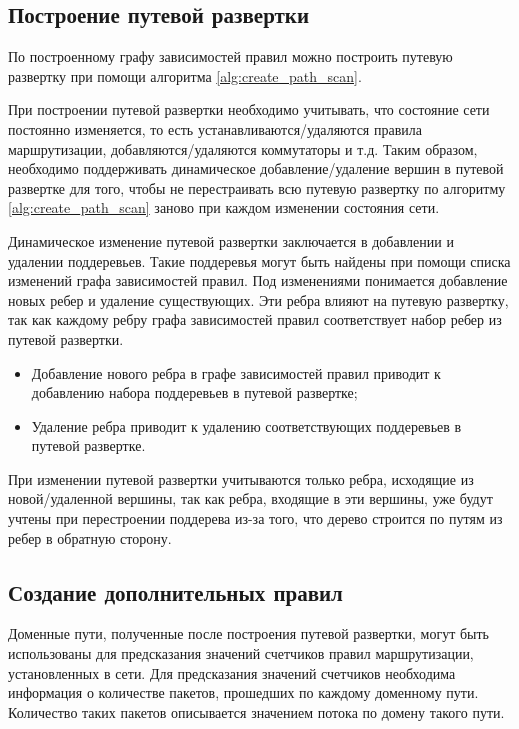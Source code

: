 \documentclass[../thesis.tex]{subfiles}
\begin{document}
\subsection{Построение путевой развертки}

По построенному графу зависимостей правил можно построить путевую развертку при помощи алгоритма \ref{alg:create_path_scan}.

При построении путевой развертки необходимо учитывать, что состояние сети постоянно изменяется, то есть устанавливаются/удаляются правила маршрутизации, добавляются/удаляются коммутаторы и т.д.
Таким образом, необходимо поддерживать динамическое добавление/удаление вершин в путевой развертке для того, чтобы не перестраивать всю путевую развертку по алгоритму \ref{alg:create_path_scan} заново при каждом изменении состояния сети.

Динамическое изменение путевой развертки заключается в добавлении и удалении поддеревьев.
Такие поддеревья могут быть найдены при помощи списка изменений графа зависимостей правил.
Под изменениями понимается добавление новых ребер и удаление существующих.
Эти ребра влияют на путевую развертку, так как каждому ребру графа зависимостей правил соответствует набор ребер из путевой развертки.
\begin{itemize}
\item Добавление нового ребра в графе зависимостей правил приводит к добавлению набора поддеревьев в путевой развертке;
\item Удаление ребра приводит к удалению соответствующих поддеревьев в путевой развертке.
\end{itemize}

При изменении путевой развертки учитываются только ребра, исходящие из новой/удаленной вершины, так как ребра, входящие в эти вершины, уже будут учтены при перестроении поддерева из-за того, что дерево строится по путям из ребер в обратную сторону.

\subsection{Создание дополнительных правил}

Доменные пути, полученные после построения путевой развертки, могут быть использованы для предсказания значений счетчиков правил маршрутизации, установленных в сети.
Для предсказания значений счетчиков необходима информация о количестве пакетов, прошедших по каждому доменному пути.
Количество таких пакетов описывается значением потока по домену такого пути.
\end{document}
